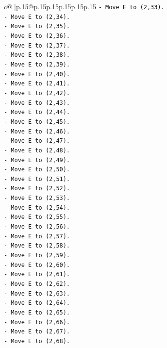 \documentclass{article}
\begin{document}
{\begin{supertabular}{c@{$\;$}|p{.15\linewidth}@{}p{.15\linewidth}p{.15\linewidth}p{.15\linewidth}p{.15\linewidth}p{.15\linewidth}}
{{{\texttt{{-} Move E to (2,33).} \\
\texttt{{-} Move E to (2,34).} \\
\texttt{{-} Move E to (2,35).} \\
\texttt{{-} Move E to (2,36).} \\
\texttt{{-} Move E to (2,37).} \\
\texttt{{-} Move E to (2,38).} \\
\texttt{{-} Move E to (2,39).} \\
\texttt{{-} Move E to (2,40).} \\
\texttt{{-} Move E to (2,41).} \\
\texttt{{-} Move E to (2,42).} \\
\texttt{{-} Move E to (2,43).} \\
\texttt{{-} Move E to (2,44).} \\
\texttt{{-} Move E to (2,45).} \\
\texttt{{-} Move E to (2,46).} \\
\texttt{{-} Move E to (2,47).} \\
\texttt{{-} Move E to (2,48).} \\
\texttt{{-} Move E to (2,49).} \\
\texttt{{-} Move E to (2,50).} \\
\texttt{{-} Move E to (2,51).} \\
\texttt{{-} Move E to (2,52).} \\
\texttt{{-} Move E to (2,53).} \\
\texttt{{-} Move E to (2,54).} \\
\texttt{{-} Move E to (2,55).} \\
\texttt{{-} Move E to (2,56).} \\
\texttt{{-} Move E to (2,57).} \\
\texttt{{-} Move E to (2,58).} \\
\texttt{{-} Move E to (2,59).} \\
\texttt{{-} Move E to (2,60).} \\
\texttt{{-} Move E to (2,61).} \\
\texttt{{-} Move E to (2,62).} \\
\texttt{{-} Move E to (2,63).} \\
\texttt{{-} Move E to (2,64).} \\
\texttt{{-} Move E to (2,65).} \\
\texttt{{-} Move E to (2,66).} \\
\texttt{{-} Move E to (2,67).} \\
\texttt{{-} Move E to (2,68).} \\
}}}
\end{supertabular}}
\end{document}
